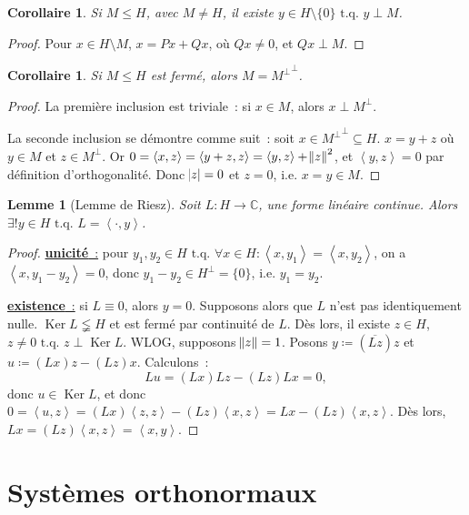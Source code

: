 \documentclass{report}
\DeclareMathOperator{\Ker}{Ker}
\newcommand{\C}{{\mathbb C}}
\newcommand{\scpr}[2]{\left\langle#1, #2\right\rangle}
\newcommand{\tq}{\text{ t.q. }}
\newcommand{\unic}{{\underline {\textbf{unicité}~:}} }
\newcommand{\exis}{{\underline {\textbf{existence}~:}} }
\newtheorem{cor}[thm]{Corollaire}
\newtheorem{lem}[thm]{Lemme}
\theoremstyle{definition}
\theoremstyle{remark}
\newtheorem*{rmq}{Remarque}
\begin{document}
\begin{cor} Si $M \leq H$, avec $M \neq H$, il existe $y \in H \setminus \{0\} \tq y \perp M$.
\end{cor}

\begin{proof} Pour $x \in H \setminus M$, $x = Px+Qx$, où $Qx \neq 0$, et $Qx \perp M$.
\end{proof}


\begin{cor} Si $M \leq H$ est fermé, alors $M = {M^\perp}^\perp$.
\end{cor}

\begin{proof} La première inclusion est triviale~: si $x \in M$, alors $x \perp M^\perp$.

La seconde inclusion se démontre comme suit~: soit $x \in {M^\perp}^\perp \subseteq H$. $x = y+z$ où $y \in M$ et $z \in M^\perp$.
Or $0 = \scpr xz = \scpr {y+z}z = \scpr yz + \norm z^2$, et $\scpr yz = 0$ par définition d'orthogonalité. Donc $\abs z = 0$ et $z=0$, i.e. $x=y \in M$.
\end{proof}

\begin{lem}[Lemme de Riesz] Soit $L : H \to \C$, une forme linéaire continue. Alors $\exists! y \in H \tq L = \scpr \cdot y$.
\end{lem}

\begin{proof} \unic pour $y_1, y_2 \in H \tq \forall x \in H : \scpr x{y_1} = \scpr x{y_2}$, on a $\scpr x{y_1-y_2} = 0$, donc $y_1-y_2 \in H^\perp = \{0\}$, i.e. $y_1=y_2$.

\exis si $L \equiv 0$, alors $y=0$. Supposons alors que $L$ n'est pas identiquement nulle. $\Ker L \lneqq H$ et est fermé par continuité de $L$. Dès lors, il existe $z \in H$,
$z \neq 0 \tq z \perp \Ker L$. WLOG, supposons $\norm z = 1$. Posons $y \coloneqq (\overline {Lz})z$ et $u \coloneqq (Lx)z - (Lz)x$. Calculons~:
\[Lu = (Lx)Lz - (Lz)Lx = 0,\]
donc $u \in \Ker L$, et donc $0 = \scpr uz = (Lx)\scpr zz - (Lz)\scpr xz = Lx-(Lz)\scpr xz$. Dès lors, $Lx = (Lz)\scpr xz = \scpr xy$.
\end{proof}

\section{Systèmes orthonormaux}
\end{document}
